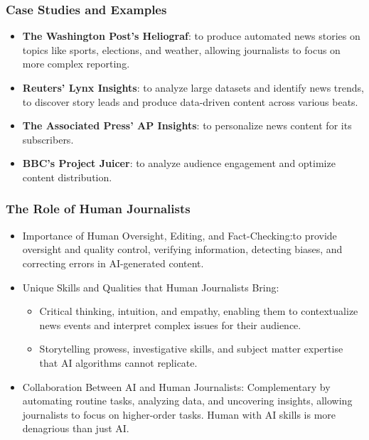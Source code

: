 \begin{frame}[fragile]\frametitle{Case Studies and Examples}

\begin{itemize}
\item \textbf{The Washington Post's Heliograf}: to produce automated news stories on topics like sports, elections, and weather, allowing journalists to focus on more complex reporting.
\item \textbf{Reuters' Lynx Insights}: to analyze large datasets and identify news trends, to discover story leads and produce data-driven content across various beats.
\item \textbf{The Associated Press' AP Insights}: to personalize news content for its subscribers.
\item \textbf{BBC's Project Juicer}: to analyze audience engagement and optimize content distribution.
\end{itemize}

\end{frame}


\begin{frame}[fragile]\frametitle{The Role of Human Journalists}

\begin{itemize}
\item Importance of Human Oversight, Editing, and Fact-Checking:to provide oversight and quality control, verifying information, detecting biases, and correcting errors in AI-generated content.
\item Unique Skills and Qualities that Human Journalists Bring:
    \begin{itemize}
        \item Critical thinking, intuition, and empathy, enabling them to contextualize news events and interpret complex issues for their audience.
        \item Storytelling prowess, investigative skills, and subject matter expertise that AI algorithms cannot replicate.
    \end{itemize}
\item Collaboration Between AI and Human Journalists: Complementary by automating routine tasks, analyzing data, and uncovering insights, allowing journalists to focus on higher-order tasks. Human with AI skills is more denagrious than just AI.
\end{itemize}

\end{frame}



